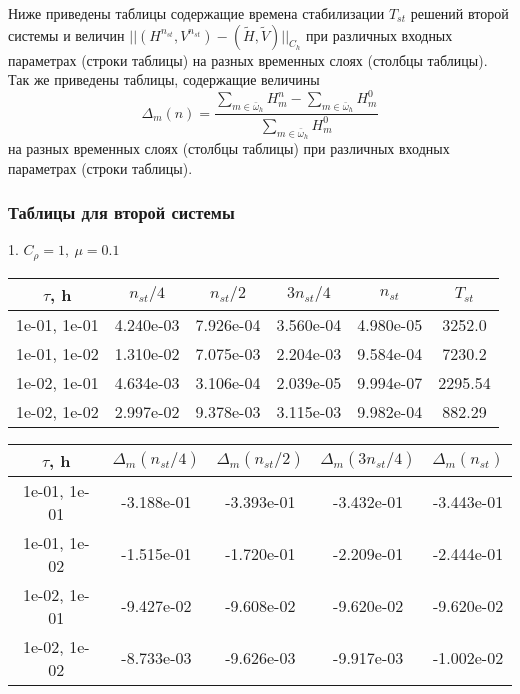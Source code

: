 \clearpage
\newpage
Ниже приведены таблицы содержащие времена стабилизации $T_{st}$ решений второй системы и величин $|| (H^{n_{st}}, V^{n_{st}}) - (\tilde{H}, \tilde{V})||_{C_h}$ при различных входных параметрах (строки таблицы) на разных временных слоях (столбцы таблицы). Так же приведены таблицы, содержащие величины 
\begin{equation*}
	\displaystyle \Delta_m (n) = \frac{\sum\limits_{m \in \bar{\omega}_h} H^n_m - \sum\limits_{m \in \bar{\omega}_h} H^0_m}{\sum\limits_{m \in \bar{\omega}_h} H^0_m}
\end{equation*}
на разных временных слоях (столбцы таблицы) при различных входных параметрах (строки таблицы).
\subsubsection{Таблицы для второй системы}

1. $C_{\rho} = 1, \ \mu = 0.1$
\begin{center}
	\begin{tabular}{ |c|c|c|c|c|c| } 
		\hline
		$\tau$, h & $n_{st}/ 4$ & $n_{st}/ 2$ & $3n_{st}/ 4$ & $n_{st}$ & $T_{st}$ \\ 
		\hline
		1e-01, 1e-01 & 4.240e-03 & 7.926e-04 & 3.560e-04 & 4.980e-05 & 3252.0\\ 
		\hline
		1e-01, 1e-02 & 1.310e-02 & 7.075e-03 & 2.204e-03 & 9.584e-04 & 7230.2\\ 
		\hline
		1e-02, 1e-01 & 4.634e-03 & 3.106e-04 & 2.039e-05 & 9.994e-07 & 2295.54\\ 
		\hline
		1e-02, 1e-02 & 2.997e-02 & 9.378e-03 & 3.115e-03 & 9.982e-04 & 882.29\\ 
		\hline
	\end{tabular}
\end{center}

\begin{center}
	\begin{tabular}{ |c|c|c|c|c| } 
		\hline
		$\tau$, h & $\Delta_m (n_{st}/ 4)$ & $\Delta_m (n_{st}/ 2)$ & $\Delta_m (3n_{st}/ 4)$ & $\Delta_m (n_{st})$ \\ 
		\hline
		1e-01, 1e-01 & -3.188e-01 & -3.393e-01 & -3.432e-01 & -3.443e-01 \\ 
		\hline
		1e-01, 1e-02 & -1.515e-01 & -1.720e-01 & -2.209e-01 & -2.444e-01 \\ 
		\hline
		1e-02, 1e-01 & -9.427e-02 & -9.608e-02 & -9.620e-02 & -9.620e-02 \\ 
		\hline
		1e-02, 1e-02 & -8.733e-03 & -9.626e-03 & -9.917e-03 & -1.002e-02 \\ 
		\hline
	\end{tabular}
\end{center}

